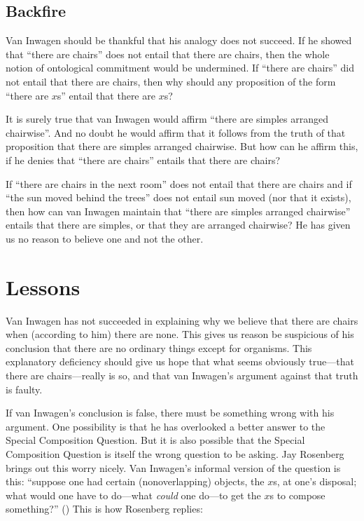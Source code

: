 \documentclass[11pt]{article}
\begin{document}
\begin{spacing}{1.5}
\subsection{Backfire}
\label{backfire}
Van Inwagen should be thankful that his analogy does not succeed.  If
he showed that ``there are chairs'' does not entail that there are
chairs, then the whole notion of ontological commitment would be
undermined.  If ``there are chairs'' did not entail that there are
chairs, then why should any proposition of the form ``there are $x$s''
entail that there are $x$s?

It is surely true that van Inwagen would affirm ``there are simples
arranged chairwise''.  And no doubt he would affirm that it follows
from the truth of that proposition that there are simples arranged
chairwise.  But how can he affirm this, if he denies that ``there are
chairs'' entails that there are chairs?

If ``there are chairs in the next room'' does not entail that there
are chairs and if ``the sun moved behind the trees'' does not entail
sun moved (nor that it exists), then how can van Inwagen maintain that
``there are simples arranged chairwise'' entails that there are
simples, or that they are arranged chairwise?  He has given us no
reason to believe one and not the other.

\section{Lessons}
\label{lessons-v}
Van Inwagen has not succeeded in explaining why we believe that there
are chairs when (according to him) there are none.  This gives us
reason be suspicious of his conclusion that there are no ordinary
things except for organisms.  This explanatory deficiency should give
us hope that what seems obviously true---that there are
chairs---really is so, and that van Inwagen's argument against that
truth is faulty.

If van Inwagen's conclusion is false, there must be something wrong
with his argument.  One possibility is that he has overlooked a better
answer to the Special Composition Question.  But it is also possible
that the Special Composition Question is itself the wrong question to
be asking.  Jay Rosenberg brings out this worry nicely.  Van Inwagen's
informal version of the question is this: ``suppose one had certain
(nonoverlapping) objects, the $x$s, at one's disposal; what would one
have to do---what {\em could} one do---to get the $x$s to compose
something?''  (\citeyear[31]{inwagen1995}) This is how Rosenberg
replies:


\end{spacing}
\end{document}
